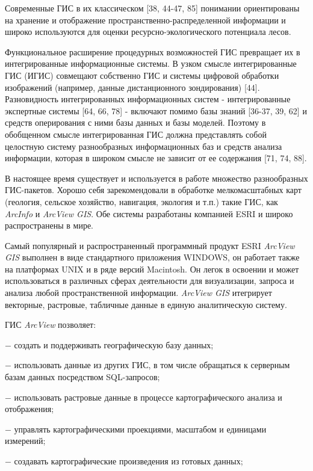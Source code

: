 \documentclass{article}
\begin{document}
Современные ГИС в их классическом [38, 44-47, 85] 
понимании ориентированы на хранение и отображение 
пространственно-распределенной информации 
и широко используются для оценки ресурсно-экологического 
потенциала лесов.

Функциональное расширение процедурных возможностей 
ГИС превращает их в интегрированные информационные 
системы. В узком смысле интегрированные ГИС 
(ИГИС) совмещают собственно ГИС и системы цифровой 
обработки изображений (например, данные дистанционного 
 зондирования) [44]. Разновидность интегрированных 
информационных систем - интегрированные экспертные 
системы [64, 66, 78] - включают помимо базы знаний 
[36-37, 39, 62] и средств оперирования с ними базы 
данных и базы моделей. Поэтому в обобщенном 
смысле интегрированная ГИС должна представлять 
собой целостную систему разнообразных информационных 
баз и средств анализа информации, которая в 
широком смысле не зависит от ее содержания 
[71, 74, 88].

В настоящее время существует и используется 
в работе множество разнообразных ГИС-пакетов. 
Хорошо себя зарекомендовали в обработке мелкомасштабных 
карт (геология, сельское хозяйство, навигация, 
экология и т.п.) такие ГИС, как \textit{ArcInfo} и \textit{ArcView 
GIS}. Обе системы разработаны компанией ESRI и широко 
распространены в мире. 

Самый популярный и распространенный программный 
продукт ESRI  \textit{ArcView GIS} выполнен в виде стандартного 
приложения WINDOWS, он работает также на платформах 
UNIX и в ряде версий Macintosh. Он легок в освоении 
и может использоваться в различных сферах деятельности 
для визуализации, запроса и анализа любой пространственной 
информации. \textit{ArcView GIS} итегрирует векторные, 
растровые, табличные данные в единую аналитическую 
систему.

ГИС \textit{ArcView }позволяет:

\ensuremath{-} создать и поддерживать географическую 
базу данных;

\ensuremath{-} использовать данные из других ГИС, 
в том числе обращаться к серверным базам данных 
посредством SQL-запросов;

\ensuremath{-} использовать растровые данные в процессе 
картографического анализа и отображения;

\ensuremath{-} управлять картографическими проекциями, 
масштабом и единицами измерений;

\ensuremath{-} создавать картографические произведения 
из готовых данных;
\end{document}
